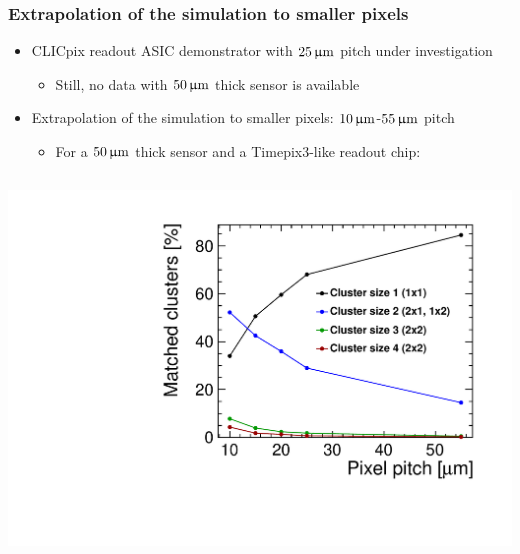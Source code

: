 \begin{frame}
  \frametitle{Extrapolation of the simulation to smaller pixels}



  \begin{itemize}
  \item CLICpix readout ASIC demonstrator with $25\,\upmu\mathrm{m}$ pitch
    under investigation
    \begin{itemize}
    \item Still, no data with $50\,\upmu\mathrm{m}$ thick sensor is available
    \end{itemize}
  \item Extrapolation of the simulation to smaller pixels:
    $10\,\upmu\mathrm{m}$-$55\,\upmu\mathrm{m}$ pitch
    \begin{itemize}
    \item For a $50\,\upmu\mathrm{m}$ thick sensor and a Timepix3-like readout
      chip:
    \end{itemize}
  \end{itemize}
    
  \begin{columns}
    \centering
    \includegraphics[width=\textwidth]{../figures/TestBeam/ClusterSize_extrapolationSmallerPixels.pdf}


\end{columns}
\end{frame}
